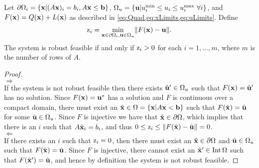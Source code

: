 \begin{thm} \label{thm:RobFeas}
  Let $\partial\Omega_i=\{\mathbf{x}| (A\mathbf{x})_i = b_i, A\mathbf{x}\leq \mathbf{b}\}$, $\Omega_{u}=\{\mathbf{u}| u^{\min}_i\leq u_i \leq u^{\max}_i \ \forall i \}$, and $F(\mathbf{x})=Q(\mathbf{x})+L(\mathbf{x})$ as described in \cref{eq:Quad,eq:xLimits,eq:uLimits}.
  Define
  \begin{align}
    \mathrm{z}_i =  \min_{\mathbf{x}\in\partial\Omega_i, \mathbf{u} \in \Omega_u} \lVert F(\mathbf{x})-\mathbf{u}\rVert. \label{eq:OPTfeas}
  \end{align}
  The system is robust feasible if and only if $\mathrm{z}_i>0$ for each $i = 1, \ldots, m$, where $m$ is the number of rows of $A$.

  \begin{proof} \ \\
    $\boxed{\Rightarrow}$ \\ 
    If the system is not robust feasible then there exists $\hat{\mathbf{u}}'\in \Omega_u$ such that $F(\mathbf{x})=\hat{\mathbf{u}}'$ has no solution. 
    Since $F(\mathbf{x})=\mathbf{u}^*$ has a solution and $F$ is continuous over a compact domain, there must exist an $\hat{\mathbf{x}} \in \Omega = \{\mathbf{x}| A\mathbf{x} < \mathbf{b}\}$ such that $F(\hat{\mathbf{x}})=\hat{\mathbf{u}}$ for some $\hat{\mathbf{u}}\in \Omega_u$. 
    Since $F$ is injective we have that $\hat{\mathbf{x}}\in\partial\Omega$, which implies that there is an $i$ such that $A\hat{\mathbf{x}}_i=b_i$, and thus $0 \leq \mathrm{z}_i \leq \lVert F(\hat{\mathbf{x}})-\hat{\mathbf{u}}\rVert=0$.\\
    $\boxed{\Leftarrow}$ \\ 
    If there exists an $i$ such that $\mathrm{z}_i = 0$, then there must exist an $\hat{\mathbf{x}} \in \partial\Omega $ and $\hat{\mathbf{u}}\in \Omega_u$ such that $F(\hat{\mathbf{x}})=\hat{\mathbf{u}}$. 
    Since $F$ is injective, there cannot exist an $\hat{\mathbf{x}}' \in \operatorname{Int}\Omega$ such that $F(\hat{\mathbf{x}}')=\hat{\mathbf{u}}$, and hence by definition the system is not robust feasible.
  \end{proof}
\end{thm}



